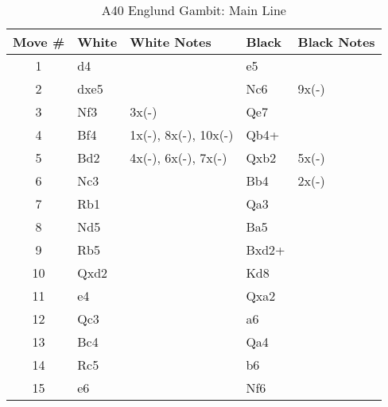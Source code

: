 \begin{table}[htbp]
\centering
\scriptsize
\caption{A40 Englund Gambit: Main Line}
\begin{tabular}{|c|l|p{5cm}|l|p{5cm}|}
\hline
\textbf{Move \#} & \textbf{White} & \textbf{White Notes} & \textbf{Black} & \textbf{Black Notes} \\
\hline
1  & d4    &                     & e5    &                        \\
2  & dxe5  &                     & Nc6   & 9x(-)                  \\
3  & Nf3   & 3x(-)               & Qe7   &                        \\
4  & Bf4   & 1x(-), 8x(-), 10x(-) & Qb4+  &                        \\
5  & Bd2   & 4x(-), 6x(-), 7x(-) & Qxb2  & 5x(-)                  \\
6  & Nc3   &                     & Bb4   & 2x(-)                  \\
7  & Rb1   &                     & Qa3   &                        \\
8  & Nd5   &                     & Ba5   &                        \\
9  & Rb5   &                     & Bxd2+ &                        \\
10 & Qxd2  &                     & Kd8   &                        \\
11 & e4    &                     & Qxa2  &                        \\
12 & Qc3   &                     & a6    &                        \\
13 & Bc4   &                     & Qa4   &                        \\
14 & Rc5   &                     & b6    &                        \\
15 & e6    &                     & Nf6   &                        \\
\hline
\end{tabular}
\end{table}


